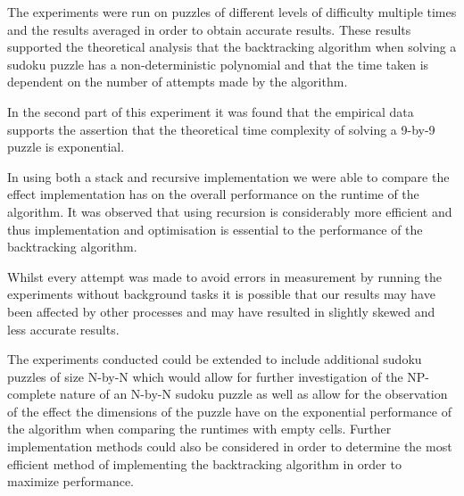 \documentclass[11pt]{article}
\begin{document}
\vspace{3mm}

The experiments were run on puzzles of different levels of difficulty multiple times and the results averaged in order to obtain accurate results. 
These results supported the theoretical analysis that the backtracking 
algorithm when solving a sudoku puzzle has a non-deterministic polynomial and that the time taken is dependent on the number of attempts made by the algorithm. 

\vspace{3mm}

In the second part of this experiment it was found that the empirical data supports the assertion that the theoretical time complexity of solving a 9-by-9 puzzle is exponential. 

\vspace{3mm}

In using both a stack and recursive implementation we were able to compare the effect implementation has on the overall performance on the runtime of the algorithm. 
It was observed that using recursion is considerably more efficient and thus implementation and optimisation is essential to the performance of the backtracking algorithm. 

\vspace{3mm}

Whilst every attempt was made to avoid errors in measurement by running the experiments without background tasks it is possible that our results may have been affected by other 
processes and may have resulted in slightly skewed and less accurate results. 

\vspace{3mm}

The experiments conducted could be extended to include additional sudoku puzzles of size N-by-N which would allow for further investigation of the NP-complete nature of an N-by-N 
sudoku puzzle as well as allow for the observation of the effect the dimensions of the puzzle have on the exponential performance of the algorithm when comparing the runtimes with empty cells. 
Further implementation methods could also be considered in order to determine the most efficient method of implementing the backtracking algorithm in order to maximize performance. 

\newpage


\end{document}
